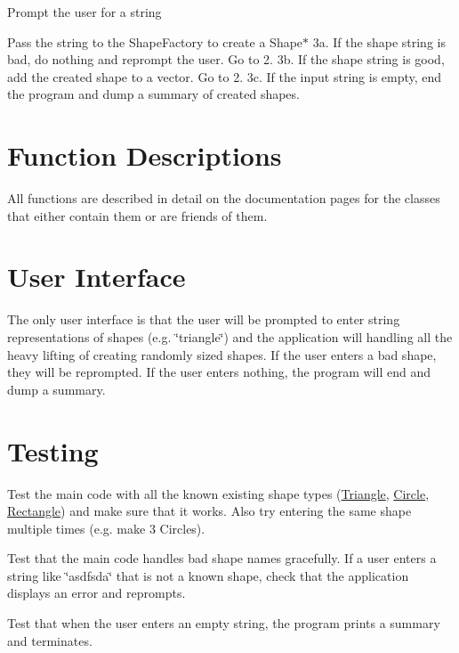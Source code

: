 \begin{DoxyEnumerate}
\item Prompt the user for a string
\item Pass the string to the Shape\+Factory to create a Shape$\ast$ 3a. If the shape string is bad, do nothing and reprompt the user. Go to 2. 3b. If the shape string is good, add the created shape to a vector. Go to 2. 3c. If the input string is empty, end the program and dump a summary of created shapes.
\end{DoxyEnumerate}\hypertarget{index_functions}{}\section{Function Descriptions}\label{index_functions}
All functions are described in detail on the documentation pages for the classes that either contain them or are friends of them.\hypertarget{index_ui}{}\section{User Interface}\label{index_ui}
The only user interface is that the user will be prompted to enter string representations of shapes (e.\+g. \char`\"{}triangle\char`\"{}) and the application will handling all the heavy lifting of creating randomly sized shapes. If the user enters a bad shape, they will be reprompted. If the user enters nothing, the program will end and dump a summary.\hypertarget{index_testing}{}\section{Testing}\label{index_testing}
Test the main code with all the known existing shape types (\hyperlink{class_triangle}{Triangle}, \hyperlink{class_circle}{Circle}, \hyperlink{class_rectangle}{Rectangle}) and make sure that it works. Also try entering the same shape multiple times (e.\+g. make 3 Circles).

Test that the main code handles bad shape names gracefully. If a user enters a string like \char`\"{}asdfsda\char`\"{} that is not a known shape, check that the application displays an error and reprompts.

Test that when the user enters an empty string, the program prints a summary and terminates. 